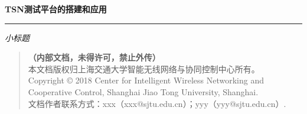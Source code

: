 \thispagestyle{empty}

\noindent
\begin{minipage}{\textwidth}
\raggedright
{\huge \bfseries TSN测试平台的搭建和应用}
\noindent\rule[-1ex]{\textwidth}{5pt}
\hfill\emph{\Large 小标题}
\end{minipage}

\noindent{}


\begin{quote}\footnotesize
   \textbf{（内部文档，未得许可，禁止外传）}\\
    本文档版权归上海交通大学智能无线网络与协同控制中心﻿所有。\\
    Copyright \copyright{}  2018  Center for Intelligent Wireless Networking and Cooperative Control, Shanghai Jiao Tong University, Shanghai. \\
    文档作者联系方式：xxx（xxx@sjtu.edu.cn）；yyy（yyy@sjtu.edu.cn）.
\end{quote}